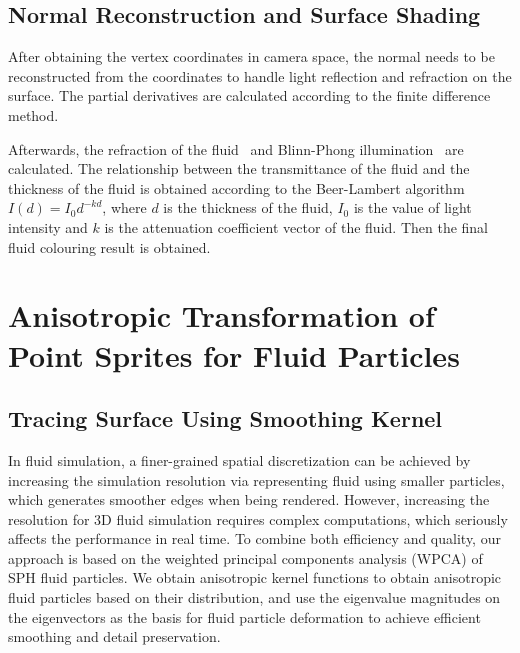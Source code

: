 \documentclass[times,twocolumn,final]{elsarticle}
\begin{document}
\subsection{Normal Reconstruction and Surface Shading}
After obtaining the vertex coordinates in camera space, the normal needs to be reconstructed from the coordinates to handle light reflection and refraction on the surface. The partial derivatives are calculated according to the finite difference method.

Afterwards, the refraction of the fluid~\cite{ref:ref25} and Blinn-Phong illumination~\cite{ref:ref27} are calculated. The relationship between the transmittance of the fluid and the thickness of the fluid is obtained according to the Beer-Lambert algorithm\cite{ref:ref28} $I(d)=I_{0} d^{-k d}$, where $d$ is the thickness of the fluid, $I_0$ is the value of light intensity and $k$ is the attenuation coefficient vector of the fluid. Then the final fluid colouring result is obtained.

\section{Anisotropic Transformation of Point Sprites for Fluid Particles}
\subsection{Tracing Surface Using Smoothing Kernel}
In fluid simulation, a finer-grained spatial discretization can be achieved by increasing the simulation resolution via representing fluid using smaller particles, which generates smoother edges when being rendered. However, increasing the resolution for 3D fluid simulation requires complex computations, which seriously affects the performance in real time. To combine both efficiency and quality, our approach is based on the weighted principal components analysis (WPCA) of SPH fluid particles. We obtain anisotropic kernel functions to obtain anisotropic fluid particles based on their distribution, and use the eigenvalue magnitudes on the eigenvectors as the basis for fluid particle deformation to achieve efficient smoothing and detail preservation.
\end{document}
